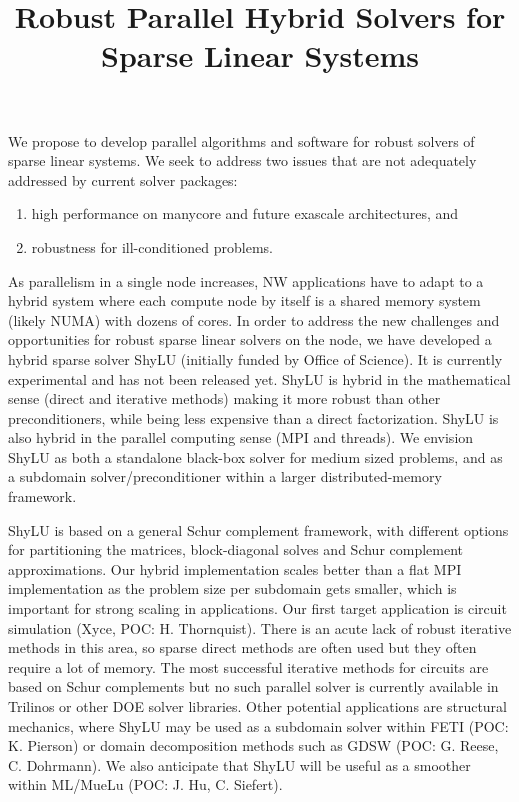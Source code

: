\documentclass[10pt]{amsart}
\date{}
\title{Robust Parallel Hybrid Solvers for Sparse Linear Systems}
\begin{document}
\maketitle

\vspace{-4mm}
We propose to develop parallel algorithms and software for robust solvers
of sparse linear systems. We seek to address two issues that
are not adequately addressed by current solver packages:
\begin{enumerate}
\item high performance on manycore and future exascale architectures, and
\item robustness for ill-conditioned problems.
\end{enumerate}

As parallelism in a single node increases, NW applications
have to adapt to a hybrid system where each compute node by itself
is a shared memory system (likely NUMA) with dozens of cores. 
In order to address the new challenges and opportunities 
for robust sparse linear solvers on the node,
we have developed a hybrid sparse solver ShyLU (initially funded by 
Office of Science). It is currently experimental and
has not been released yet. ShyLU is hybrid in the
mathematical sense (direct and iterative methods) making it more
robust than other preconditioners, while being less expensive
than a direct factorization.  ShyLU is also hybrid in the parallel
computing sense (MPI and threads). We envision ShyLU as both
a standalone black-box solver for medium sized problems,
and as a subdomain solver/preconditioner within a larger 
distributed-memory framework. 

ShyLU is based on a general Schur complement framework, with different options
for partitioning the matrices, block-diagonal solves and Schur complement
approximations.  Our hybrid implementation scales better than
a flat MPI implementation as the problem size per subdomain gets smaller, 
which is important for strong scaling in applications.
Our first target application is circuit simulation (Xyce, POC: H. Thornquist). 
There is an acute lack of robust iterative methods in this area, so sparse
direct methods are often used but they often require a lot of memory.
The most successful iterative methods
for circuits are based on Schur complements but no such parallel solver
is currently available in Trilinos or other DOE solver libraries.
%
Other potential applications are structural mechanics, where ShyLU
may be used as a subdomain solver within FETI (POC: K. Pierson) or
domain decomposition methods such as GDSW (POC: G. Reese, C. Dohrmann). 
We also anticipate that ShyLU
will be useful as a smoother within ML/MueLu (POC: J. Hu, C. Siefert).
\end{document}
